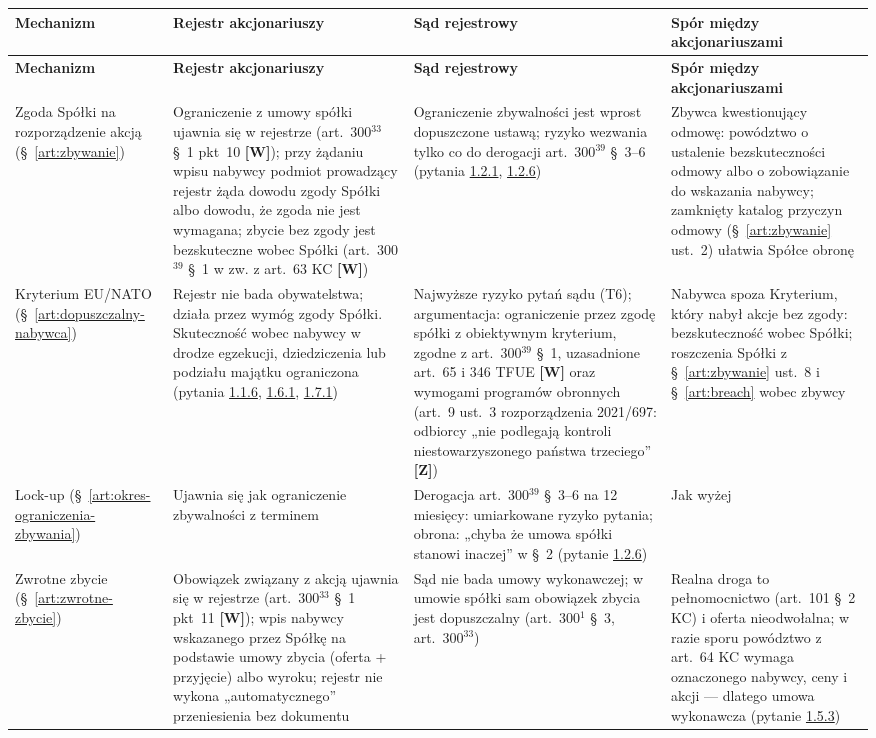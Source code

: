 \documentclass[12pt,a4paper]{report}
\newcommand{\Wiar}[1]{\textbf{[#1]}}
\begin{document}
\begin{longtable}{@{}p{2.8cm} p{3.8cm} p{3.4cm} p{4.5cm}@{}}
\toprule
\textbf{Mechanizm} & \textbf{Rejestr akcjonariuszy} & \textbf{Sąd rejestrowy} & \textbf{Spór między akcjonariuszami} \\
\midrule
\endfirsthead
\toprule
\textbf{Mechanizm} & \textbf{Rejestr akcjonariuszy} & \textbf{Sąd rejestrowy} & \textbf{Spór między akcjonariuszami} \\
\midrule
\endhead
Zgoda Spółki na rozporządzenie akcją (§~\ref{art:zbywanie}) & Ograniczenie z umowy spółki ujawnia się w rejestrze (art.~300$^{33}$ §~1 pkt~10 \Wiar{W}); przy żądaniu wpisu nabywcy podmiot prowadzący rejestr żąda dowodu zgody Spółki albo dowodu, że zgoda nie jest wymagana; zbycie bez zgody jest bezskuteczne wobec Spółki (art.~300$^{39}$ §~1 w zw. z art.~63 KC \Wiar{W}) & Ograniczenie zbywalności jest wprost dopuszczone ustawą; ryzyko wezwania tylko co do derogacji art.~300$^{39}$ §~3--6 (pytania \hyperref[memo:1.2.1]{1.2.1}, \hyperref[memo:1.2.6]{1.2.6}) & Zbywca kwestionujący odmowę: powództwo o ustalenie bezskuteczności odmowy albo o zobowiązanie do wskazania nabywcy; zamknięty katalog przyczyn odmowy (§~\ref{art:zbywanie} ust.~2) ułatwia Spółce obronę \\
Kryterium EU/NATO (§~\ref{art:dopuszczalny-nabywca}) & Rejestr nie bada obywatelstwa; działa przez wymóg zgody Spółki. Skuteczność wobec nabywcy w drodze egzekucji, dziedziczenia lub podziału majątku ograniczona (pytania \hyperref[memo:1.1.6]{1.1.6}, \hyperref[memo:1.6.1]{1.6.1}, \hyperref[memo:1.7.1]{1.7.1}) & Najwyższe ryzyko pytań sądu (T6); argumentacja: ograniczenie przez zgodę spółki z obiektywnym kryterium, zgodne z art.~300$^{39}$ §~1, uzasadnione art.~65 i 346 TFUE \Wiar{W} oraz wymogami programów obronnych (art.~9 ust.~3 rozporządzenia 2021/697: odbiorcy „nie podlegają kontroli niestowarzyszonego państwa trzeciego” \Wiar{Z}) & Nabywca spoza Kryterium, który nabył akcje bez zgody: bezskuteczność wobec Spółki; roszczenia Spółki z §~\ref{art:zbywanie} ust.~8 i §~\ref{art:breach} wobec zbywcy \\
Lock-up (§~\ref{art:okres-ograniczenia-zbywania}) & Ujawnia się jak ograniczenie zbywalności z terminem & Derogacja art.~300$^{39}$ §~3--6 na 12 miesięcy: umiarkowane ryzyko pytania; obrona: „chyba że umowa spółki stanowi inaczej” w §~2 (pytanie \hyperref[memo:1.2.6]{1.2.6}) & Jak wyżej \\
Zwrotne zbycie (§~\ref{art:zwrotne-zbycie}) & Obowiązek związany z akcją ujawnia się w rejestrze (art.~300$^{33}$ §~1 pkt~11 \Wiar{W}); wpis nabywcy wskazanego przez Spółkę na podstawie umowy zbycia (oferta + przyjęcie) albo wyroku; rejestr nie wykona „automatycznego” przeniesienia bez dokumentu & Sąd nie bada umowy wykonawczej; w umowie spółki sam obowiązek zbycia jest dopuszczalny (art.~300$^{1}$ §~3, art.~300$^{33}$) & Realna droga to pełnomocnictwo (art.~101 §~2 KC) i oferta nieodwołalna; w razie sporu powództwo z art.~64 KC wymaga oznaczonego nabywcy, ceny i akcji --- dlatego umowa wykonawcza (pytanie \hyperref[memo:1.5.3]{1.5.3}) \\

\end{longtable}
\end{document}
